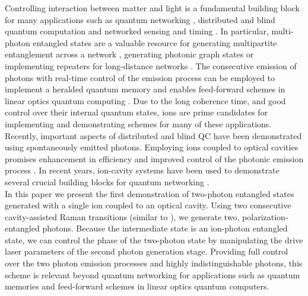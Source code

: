 \documentclass[aps,prl,twocolumn,floatfix,superscriptaddress]{revtex4-2}
\begin{document}
Controlling interaction between matter and light is a fundamental building block for many applications such as quantum networking \cite{kimble2008quantum, duan2010quantum, wehner2018quantum, wei2022towards, azuma2023quantum, Beukers2024RemoteEntanglement}, distributed and blind quantum computation \cite{Monroe2014, Brown2016, Main2025Distributed, Jiang2007DistributedQC, Broadbent2009Universal, Drmota2024Verifiable} and networked sensing and timing \cite{Zhang2021Distributed, Gottesman2012LongerBaseline, Komar2014Quantum, Nichol2022QuantumClocks}.
In particular, multi-photon entangled states are a valuable resource for generating multipartite entanglement across a network \cite{Meignant2019GraphStatesNetworks, Vivoli2019GHZGeneration}, generating photonic graph states  \cite{ Thomas2022GraphStates} or implementing repeaters for long-distance networks \cite{Wallnofer2016TwoDimRepeaters, Krutyanskiy2023TelecomRepeater, Munro2015InsideRepeaters, Azuma2015AllPhotonicRepeaters, Jiang2009QuantumRepeaterEncoding, Simon2007PhotonPairRepeaters, Sangouard2011QuantumRepeaters, Langenfeld2021QuantumRepeaterQKD}.
The consecutive emission of photons with real-time control of the emission process can be employed to implement a heralded quantum memory \cite{Bussieres2013OpticalMemories, Tanji2009HeraldedMemory} and enables feed-forward schemes in linear optics quantum computing \cite{Knill2001LinearOpticsQC, Kok2007LOQCReview, Wootton2012QuantumMemories}.
Due to the long coherence time, and good control over their internal quantum states, ions are prime candidates for implementing and demonstrating schemes for many of these applications. Recently, important aspects of distributed and blind QC have been demonstrated \cite{Drmota2024Verifiable, Main2025Distributed} using spontaneously emitted photons. Employing ions coupled to optical cavities promises enhancement in efficiency and improved control of the photonic emission process \cite{PhysRevLett.124.013602, Walker2020, Keller2022TimeBinPhotons}.
In recent years, ion-cavity systems have been used to demonstrate several crucial building blocks for quantum networking \cite{stute2012, stute2013, Krutyanskiy2023Entanglement230m}. \\
In this paper we present the first demonstration of two-photon entangled states generated with a single ion coupled to an optical cavity. Using two consecutive cavity-assisted Raman transitions (similar to \cite{Walker2020}), we generate two, polarization-entangled photons. Because the intermediate state is an ion-photon entangled state, we can control the phase of the two-photon state by manipulating the drive laser parameters of the second photon generation stage.
Providing full control over the two photon emission processes and highly indistinguishable photons, this scheme is relevant beyond quantum networking for applications such as quantum memories and feed-forward schemes in linear optics quantum computers.
\end{document}
